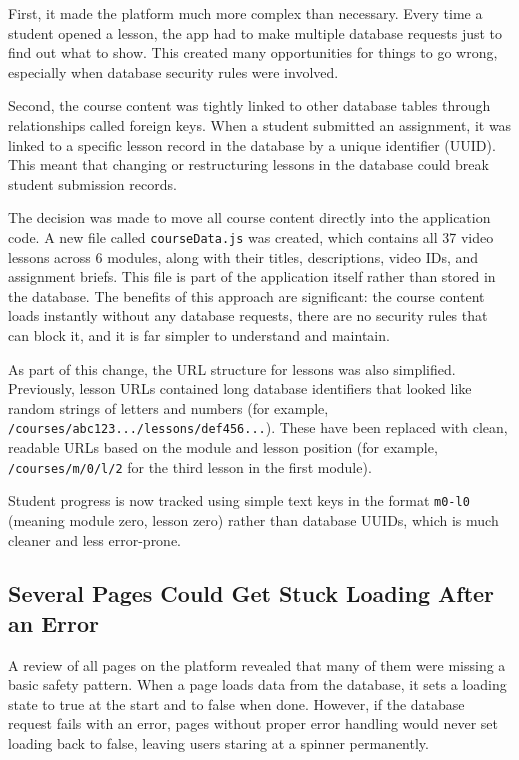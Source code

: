 \documentclass[12pt, a4paper]{article}
\begin{document}
First, it made the platform much more complex than necessary. Every time a student opened a lesson, the app had to make multiple database requests just to find out what to show. This created many opportunities for things to go wrong, especially when database security rules were involved.

Second, the course content was tightly linked to other database tables through relationships called foreign keys. When a student submitted an assignment, it was linked to a specific lesson record in the database by a unique identifier (UUID). This meant that changing or restructuring lessons in the database could break student submission records.

The decision was made to move all course content directly into the application code. A new file called \texttt{courseData.js} was created, which contains all 37 video lessons across 6 modules, along with their titles, descriptions, video IDs, and assignment briefs. This file is part of the application itself rather than stored in the database. The benefits of this approach are significant: the course content loads instantly without any database requests, there are no security rules that can block it, and it is far simpler to understand and maintain.

As part of this change, the URL structure for lessons was also simplified. Previously, lesson URLs contained long database identifiers that looked like random strings of letters and numbers (for example, \texttt{/courses/abc123.../lessons/def456...}). These have been replaced with clean, readable URLs based on the module and lesson position (for example, \texttt{/courses/m/0/l/2} for the third lesson in the first module).

Student progress is now tracked using simple text keys in the format \texttt{m0-l0} (meaning module zero, lesson zero) rather than database UUIDs, which is much cleaner and less error-prone.

\subsection{Several Pages Could Get Stuck Loading After an Error}

A review of all pages on the platform revealed that many of them were missing a basic safety pattern. When a page loads data from the database, it sets a loading state to true at the start and to false when done. However, if the database request fails with an error, pages without proper error handling would never set loading back to false, leaving users staring at a spinner permanently.
\end{document}

